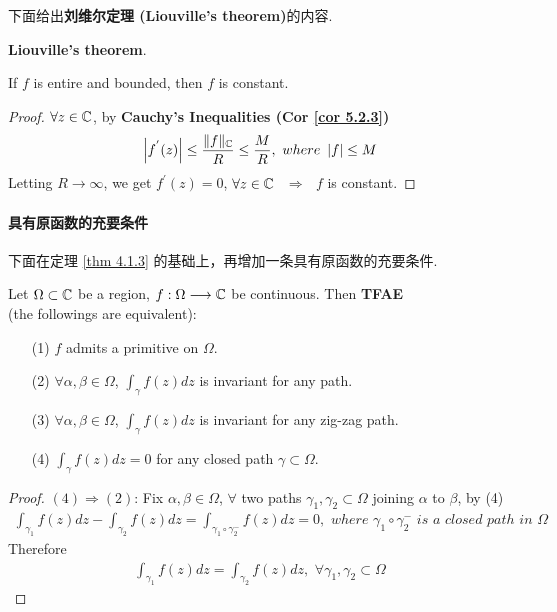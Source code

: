 \vspace{2em}
下面给出\textbf{刘维尔定理 (Liouville's theorem)}的内容.
\begin{corollary}\label{cor 5.2.4}
	\textbf{Liouville's theorem}.
	\begin{center}
		If $f$ is entire and bounded, then $f$ is constant.
	\end{center}
	
	\vspace{2em}
	\begin{proof}
		$\forall z \in \mathbb{C}$, by \textbf{Cauchy's Inequalities (Cor \ref{cor 5.2.3})}
		\begin{align}
			\left| f^{'}(z) \right| \leq \frac{\Vert f \Vert_{\mathbb{C}}}{R} \leq \frac{M}{R} , \,\, where \,\, \left| f \right| \leq M
		\end{align}
		Letting $R \to \infty$, we get $f^{'}(z) = 0$, $\forall z \in \mathbb{C}$ $\,\, \Rightarrow \,\,$ $f$ is constant.
	\end{proof}
\end{corollary}

\newpage
\paragraph{具有原函数的充要条件}
下面在定理 \ref{thm 4.1.3} 的基础上，再增加一条具有原函数的充要条件.
\begin{thm}\label{thm 5.2.5}
	Let $\Omega \subset \mathbb{C}$ be a region, $f : \Omega \longrightarrow \mathbb{C}$ be continuous. Then \textbf{TFAE} \\
	(the followings are equivalent):
	\begin{enumerate}
		\item[(1)]$f$ admits a primitive on $\Omega$.
		
		\item[(2)]$\forall \alpha , \beta \in \Omega$, $\int_{\gamma}{f(z) dz}$ is invariant for any path.
		
		\item[(3)]$\forall \alpha , \beta \in \Omega$, $\int_{\gamma}{f(z) dz}$ is invariant for any zig-zag path.
		
		\item[(4)]$\int_{\gamma}{f(z) dz} = 0$ for any closed path $\gamma \subset \Omega$. 
	\end{enumerate}
	
	\vspace{2em}
	\begin{proof}
		$(4) \Rightarrow (2)$: Fix $\alpha , \beta \in \Omega$, $\forall$ two paths $\gamma_1 , \gamma_2 \subset \Omega$ joining $\alpha$ to $\beta$, by (4)
		\begin{align}
			\int_{\gamma_1}{f(z) dz} - \int_{\gamma_2}{f(z) dz} = \int_{\gamma_1 \circ \gamma_{2}^{-}}{f(z) dz} = 0 , \,\, where \,\, \gamma_1 \circ \gamma_{2}^{-} \,\, is \,\, a  \,\, closed \,\, path \,\, in \,\, \Omega
		\end{align}
		Therefore
		\begin{align}
			\int_{\gamma_1}{f(z) dz} = \int_{\gamma_2}{f(z) dz} , \,\, \forall \gamma_1 , \gamma_2 \subset \Omega
		\end{align}
	\end{proof}
\end{thm}

